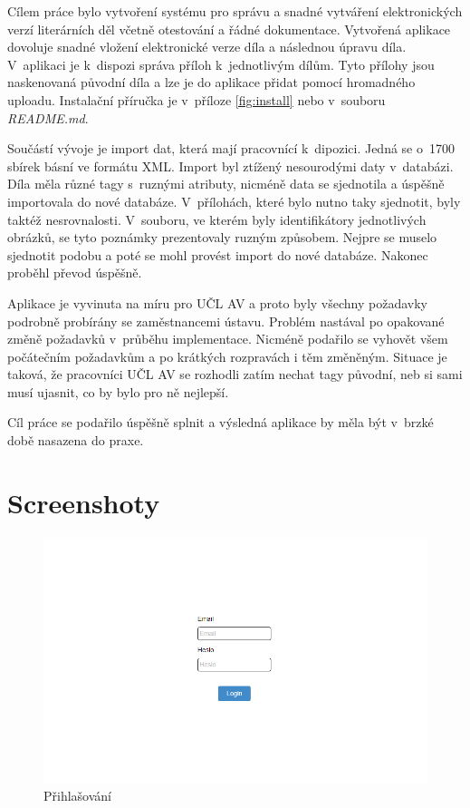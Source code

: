 \documentclass[thesis=B,czech]{FITthesis}[2012/06/26]
\begin{document}
\begin{conclusion}
    
	Cílem práce bylo vytvoření systému pro správu a snadné vytváření elektronických verzí literárních děl včetně otestování a řádné dokumentace. Vytvořená aplikace dovoluje snadné vložení elektronické verze díla a následnou úpravu díla. V~aplikaci je k~dispozi správa příloh k~jednotlivým dílům. Tyto přílohy jsou naskenovaná původní díla a lze je do aplikace přidat pomocí hromadného uploadu. Instalační příručka je v~příloze \ref{fig:install} nebo v~souboru \textit{README.md}.
	
	Součástí vývoje je import dat, která mají pracovnící k~dipozici. Jedná se o~1700 sbírek básní ve formátu XML. Import byl ztížený nesourodými daty v~databázi. Díla měla různé tagy s~ruznými atributy, nicméně data se sjednotila a úspěšně importovala do nové databáze. V~přílohách, které bylo nutno taky sjednotit, byly taktéž nesrovnalosti. V~souboru, ve kterém byly identifikátory jednotlivých obrázků, se tyto poznámky prezentovaly ruzným způsobem. Nejpre se muselo sjednotit podobu a poté se mohl provést import do nové databáze. Nakonec proběhl převod úspěšně.
	
	Aplikace je vyvinuta na míru pro UČL AV a proto byly všechny požadavky podrobně probírány se zaměstnancemi ústavu. Problém nastával po opakované změně požadavků v~průběhu implementace. Nicméně podařilo se vyhovět všem počátečním požadavkům a po krátkých rozpravách i těm změněným. Situace je taková, že pracovníci UČL AV se rozhodli zatím nechat tagy původní, neb si sami musí ujasnit, co by bylo pro ně nejlepší.
	
	Cíl práce se podařilo úspěšně splnit a výsledná aplikace by měla být v~brzké době nasazena do praxe.

\end{conclusion}




\appendix

\chapter{Screenshoty}

    \begin {figure}[H]\centering
        \includegraphics[width=\textwidth]{images/login}
        \caption {Přihlašování}
        \label {fig:login}
    \end{figure}
\end{document}
